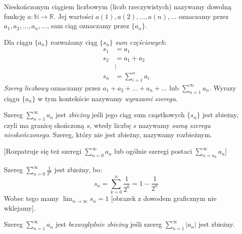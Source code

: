 \begin{definition}
    Nieskończonym ciągiem liczbowym (liczb rzeczywistych) nazywamy dowolną funkcję $a: \mathbb{N} \rightarrow \mathbb{R}$. Jej wartości $a(1), a(2), ..., a(n), ...$ oznaczamy przez $a_1, a_2, ..., a_n, ...$, sam ciąg oznaczamy przez $\{a_n\}$.
\end{definition}

\begin{definition}
    Dla ciągu $\{a_n\}$ rozważamy ciąg $\{s_n\}$ \textit{sum częściowych}:
    \begin{align*} 
        s_1 &=  a_1 \\ 
        s_2 &=  a_1 + a_2 \\
        &\vdots\\
        s_n &=  \sum_{i=1}^n a_i
    \end{align*}
    \textit{Szereg liczbowy} oznaczamy przez $a_1 + a_2 + ... + a_n + ...$ lub $\sum_{n=1}^\infty a_n$. Wyrazy ciągu $\{a_n\}$ w tym kontekście nazywamy \textit{wyrazami szeregu}.
\end{definition}

\begin{definition}
    Szereg $\sum_{n=1}^\infty a_n$ jest \textit{zbieżny} jeśli jego ciąg sum cząstkowych $\{s_n\}$ jest zbieżny, czyli ma granicę skończoną $s$, wtedy liczbę $s$ nazywamy \textit{sumą szeregu nieskończonego}. Szereg, który nie jest zbieżny, nazywamy rozbieżnym.
\end{definition}

[Rozpatruje się też szeregi $\sum_{n=0}^\infty a_n$ lub ogólnie szeregi postaci $\sum_{n=n_0}^\infty a_n$]

\begin{example}
    Szereg $\sum_{n=0}^\infty \frac{1}{2^n}$ jest zbieżny, bo:
    $$s_n = \sum_{k=0}^n \frac{1}{2^k} = 1 - \frac{1}{2^n}$$
    Wobec tego mamy $\lim_{n\to\infty}{s_n} = 1$
    [obrazek z dowodem graficznym nie wklejamy].
\end{example}

\begin{definition}
    Szereg $\sum_{n=1}^\infty a_n$ jest \textit{bezwzględnie zbieżny} jeśli szereg $\sum_{n=1}^\infty |a_n|$ jest zbieżny.
\end{definition} \newpage